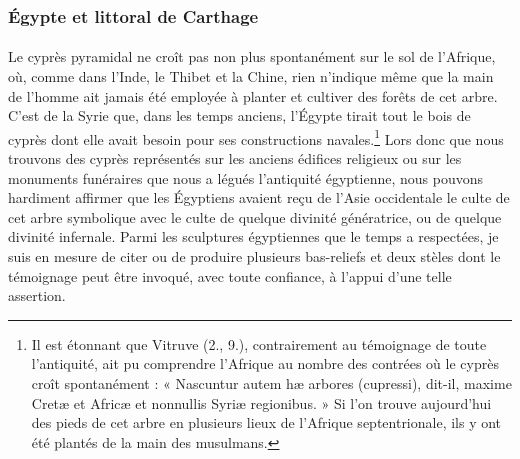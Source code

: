 \documentclass{article}
\begin{document}
\subsubsection{Égypte et littoral de Carthage}
\paragraph{}
Le cyprès pyramidal ne croît pas non plus spontanément sur le sol de l'Afrique, où, comme dans l'Inde, le Thibet et la Chine, rien n'indique même que la main de l'homme ait jamais été employée à planter et cultiver des forêts de cet arbre. C'est de la Syrie que, dans les temps anciens, l'Égypte tirait tout le bois de cyprès dont elle avait besoin pour ses constructions navales.\footnote{Il est étonnant que Vitruve (2., 9.), contrairement au témoignage de toute l'antiquité, ait pu comprendre l'Afrique au nombre des contrées où le cyprès croît spontanément : « Nascuntur autem hæ arbores (cupressi), dit-il, maxime Cretæ et Africæ et nonnullis Syriæ regionibus. » Si l'on trouve aujourd'hui des pieds de cet arbre en plusieurs lieux de l'Afrique septentrionale, ils y ont été plantés de la main des musulmans.} Lors donc que nous trouvons des cyprès représentés sur les anciens édifices religieux ou sur les monuments funéraires que nous a légués l'antiquité égyptienne, nous pouvons hardiment affirmer que les Égyptiens avaient reçu de l'Asie occidentale le culte de cet arbre symbolique avec le culte de quelque divinité génératrice, ou de quelque divinité infernale. Parmi les sculptures égyptiennes que le temps a respectées, je suis en mesure de citer ou de produire plusieurs bas-reliefs et deux stèles dont le témoignage peut être invoqué, avec toute confiance, à l'appui d'une telle assertion.
\end{document}
